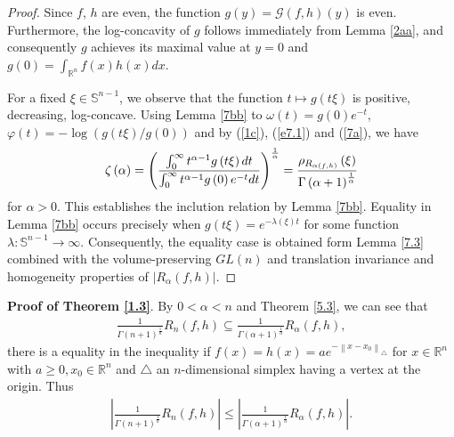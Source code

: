 \documentclass[preprint,12pt]{elsarticle}
\begin{document}
\begin{proof}
Since $f$, $h$ are even, the function $ g\left ( y \right ) =\mathscr{G}\left ( f,h \right )\left ( y \right ) $ is even. Furthermore, the log-concavity of $g$ follows immediately from Lemma \ref{2aa}, and consequently $g$ achieves its maximal value at $y=0$ and $g(0)=\int_{\mathbb{R}^n }f\left ( x \right )h\left ( x \right )dx$.

For a fixed $\xi \in \mathbb{S}^{n-1}$, we observe that the function $t\longmapsto g\left ( t\xi  \right )$ is positive, decreasing, log-concave. Using Lemma \ref{7bb} to $\omega \left ( t \right )=g\left ( 0 \right )e^{-t}$, $\varphi \left ( t \right )=-\log\left ( g\left ( t\xi  \right )/g\left ( 0 \right )   \right ) $ and by (\ref{1c}), (\ref{e7.1}) and (\ref{7a}), we have
\begin{eqnarray}
\zeta\left ( \alpha  \right )=\left ( \frac{\int_{0}^{\infty }t^{\alpha -1}g\left ( t\xi  \right )dt   }{\int_{0}^{\infty }t^{\alpha -1}g\left ( 0 \right )e^{-t}dt    }  \right )^{\frac{1}{\alpha } }=\frac{\rho _{R_{\alpha \left ( f,h \right ) } }\left ( \xi  \right )}{\Gamma \left ( \alpha +1 \right )^{\frac{1}{\alpha } }  } \notag
\end{eqnarray}
for $\alpha > 0  $. This establishes the inclution relation by Lemma \ref{7bb}. Equality in Lemma \ref{7bb} occurs precisely when $g\left ( t\xi  \right )=e^{-\lambda\left ( \xi  \right )t } $ for some function $\lambda:{\mathbb{S}}^{n-1}\to\infty$. Consequently, the equality case is obtained form Lemma \ref{7.3} combined with the  volume-preserving $GL\left ( n \right )$ and translation invariance and homogeneity properties of $  \left | R_{\alpha }  \left ( f,h \right )
\right |$.
\end{proof}
\noindent\textbf{Proof of Theorem \ref{1.3}}.
By $0<\alpha <n$ and Theorem \ref{5.3}, we can see that
\begin{eqnarray*}
	\frac{1}{\Gamma \left ( n +1 \right )^{\frac{1}{n } }  }R_{n }\left ( f,h \right )\subseteq \frac{1}{\Gamma \left ( \alpha  +1 \right )^{\frac{1}{\alpha } }  }R_{\alpha  }\left ( f,h \right ),
\end{eqnarray*}
there is a equality in the inequality if $f\left ( x \right )=h\left ( x \right )=ae^{-\left \| x-x_{0}  \right \|_{\bigtriangleup }  }$ for $x\in \mathbb{R}^n  $ with $a \ge 0,x_{0}\in \mathbb{R}^n $ and $\bigtriangleup $ an $n$-dimensional simplex having a vertex at the origin. 
Thus
\begin{eqnarray*}
	\left|\frac{1}{\Gamma \left ( n +1 \right )^{\frac{1}{n } }  }R_{n }\left ( f,h \right )\right|\le \left|\frac{1}{\Gamma \left ( \alpha  +1 \right )^{\frac{1}{\alpha } }  }R_{\alpha  }\left ( f,h \right )\right|.
\end{eqnarray*}
\end{document}
